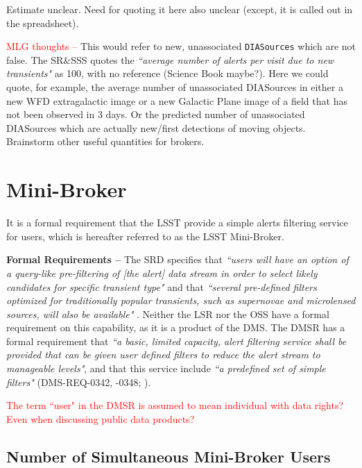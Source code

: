 \documentclass[DM,authoryear,toc]{lsstdoc}
\begin{document}
Estimate unclear. Need for quoting it here also unclear (except, it is called out in the spreadsheet).

\textcolor{red}{MLG thoughts --} This would refer to new, unassociated {\tt DIASources} which are not false. The SR\&SSS quotes the {\it ``average number of alerts per visit due to new transients"} as 100, with no reference (Science Book maybe?). Here we could quote, for example, the average number of unassociated DIASources in either a new WFD extragalactic image or a new Galactic Plane image of a field that has not been observed in $3$ days. Or the predicted number of unassociated DIASources which are actually new/first detections of moving objects. Brainstorm other useful quantities for brokers.



\section{Mini-Broker} \label{sec:minibroker}

It is a formal requirement that the LSST provide a simple alerts filtering service for users, which is hereafter referred to as the LSST Mini-Broker.

{\bf Formal Requirements --} The SRD specifies that {\it ``users will have an option of a query-like pre-filtering of [the alert] data stream in order to select likely candidates for specific transient type"} and that {\it ``several pre-defined filters optimized for traditionally popular transients, such as supernovae and microlensed sources, will also be available"} . Neither the LSR nor the OSS have a formal requirement on this capability, as it is a product of the DMS. The DMSR has a formal requirement that {\it ``a basic, limited capacity, alert filtering service shall be provided that can be given user defined filters to reduce the alert stream to manageable levels"}, and that this service include {\it ``a predefined set of simple filters"} (DMS-REQ-0342, -0348; ). 

\textcolor{red}{The term ``user" in the DMSR is assumed to mean individual with data rights? Even when discussing public data products?}


\subsection{Number of Simultaneous Mini-Broker Users}\label{ssec:minib_users}
\end{document}
